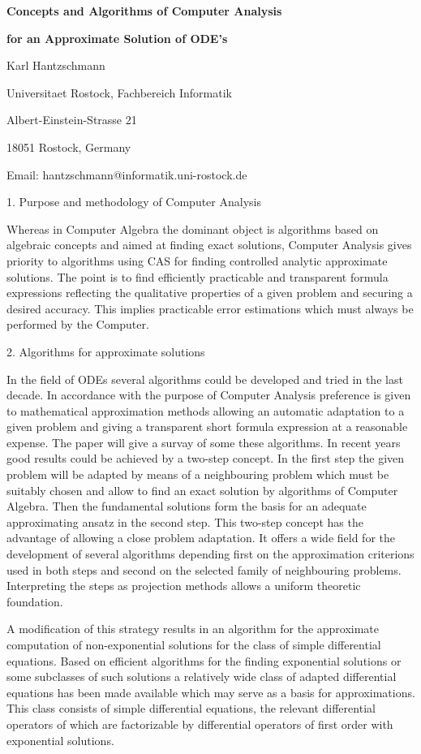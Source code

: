 

\centerline{\bf Concepts and Algorithms of Computer Analysis}
\centerline{\bf for an Approximate Solution of ODE's}

\vskip 0.3cm

\centerline{Karl Hantzschmann}
\centerline{Universitaet Rostock, Fachbereich Informatik}
\centerline{Albert-Einstein-Strasse 21}
\centerline{18051 Rostock, Germany}
\centerline{Email: hantzschmann@informatik.uni-rostock.de}

\vskip 0.3cm

1.	Purpose and methodology of Computer Analysis

Whereas in Computer Algebra the dominant object is algorithms based on
algebraic concepts and aimed  at finding exact solutions, Computer Analysis
gives priority to algorithms using CAS for finding controlled analytic
approximate solutions. The point is to find efficiently practicable and
transparent formula expressions reflecting the qualitative properties of a
given problem and securing a desired accuracy. This implies practicable
error estimations which must always be performed by the Computer.

2.	Algorithms for approximate solutions

In the field of ODEs several algorithms could be developed and tried in the
last decade. In accordance with the purpose of Computer Analysis preference
is given to mathematical approximation methods allowing an automatic
adaptation to a given problem and giving a transparent short formula
expression at a reasonable expense. The paper will give a survay of some
these algorithms.
In recent years good results could be achieved by a two-step concept. In the
first step the given problem will be adapted by means of a neighbouring
problem which must be suitably chosen and allow to find an exact solution by
algorithms of Computer Algebra. Then the fundamental solutions form the
basis for an adequate approximating ansatz in the second step. This two-step
concept has the advantage of allowing a close problem adaptation. It offers
a wide field for the development of several algorithms depending first on
the approximation criterions used in both steps and second on the selected
family of neighbouring problems. Interpreting the steps as projection
methods allows a uniform theoretic foundation.

A modification of this strategy results in an algorithm for the approximate
computation of non-exponential solutions for the class of simple
differential equations.
Based on efficient algorithms for the finding exponential solutions or some
subclasses of such solutions a relatively wide class of adapted differential
equations has been made available which may serve as a basis for
approximations. This class consists of simple differential equations, the
relevant differential operators of which are factorizable by differential
operators of first order with exponential solutions.

